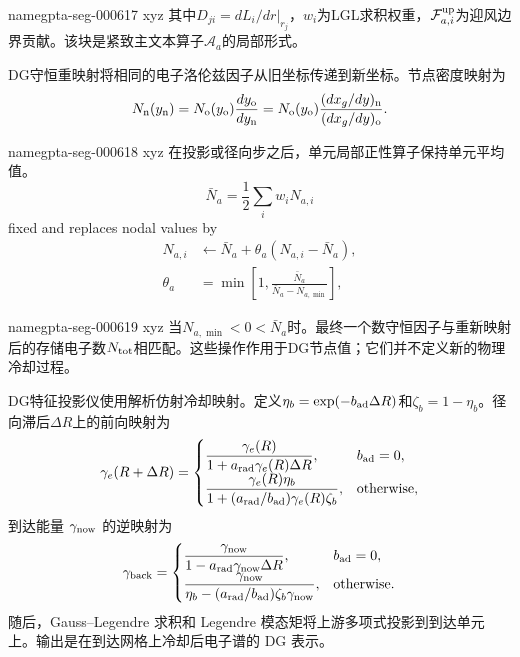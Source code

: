 \documentclass[twocolumn]{aastex702}
\makeatletter
\providecommand{\gptareaderanchor}[1]{\pdfdest name{#1} xyz}%
\providecommand{\gptareaderanchor}[1]{\special{pdf:dest (#1) [ @thispage /XYZ @xpos @ypos null ]}}%
\makeatother
\begin{document}
\gptareaderanchor{gpta-seg-000617}%
其中\(D_{ji}=\left.dL_i/dr\right|_{r_j}\)，\(w_i\)为LGL求积权重，\(\mathcal{F}_{a,i}^{\rm up}\)为迎风边界贡献。该块是紧致主文本算子\(\mathcal A_a\)的局部形式。

DG守恒重映射将相同的电子洛伦兹因子从旧坐标传递到新坐标。节点密度映射为
\begin{equation}
N_{\rm n}(y_{\rm n})=
N_{\rm o}(y_{\rm o})
\frac{dy_{\rm o}}{dy_{\rm n}}
=
N_{\rm o}(y_{\rm o})
\frac{(dx_g/dy)_{\rm n}}{(dx_g/dy)_{\rm o}} .
\end{equation}

\gptareaderanchor{gpta-seg-000618}%
在投影或径向步之后，单元局部正性算子保持单元平均值。
\begin{equation}
\bar N_a=\frac{1}{2}\sum_iw_iN_{a,i}
\end{equation}
fixed and replaces nodal values by
\begin{equation}
\begin{aligned}
N_{a,i}&\leftarrow
\bar N_a+\theta_a(N_{a,i}-\bar N_a),\\
\theta_a&=\min\left[1,\frac{\bar N_a}{\bar N_a-N_{a,\min}}\right],
\end{aligned}
\end{equation}

\gptareaderanchor{gpta-seg-000619}%
当\(N_{a,\min}<0<\bar N_a\)时。最终一个数守恒因子与重新映射后的存储电子数\(N_{\rm tot}\)相匹配。这些操作作用于DG节点值；它们并不定义新的物理冷却过程。

DG特征投影仪使用解析仿射冷却映射。定义\(\eta_b=\exp(-b_{\rm ad}\Delta R)\)和\(\zeta_b=1-\eta_b\)。径向滞后\(\Delta R\)上的前向映射为
\begin{equation}
\gamma_e(R+\Delta R)=
\begin{cases}
\displaystyle \frac{\gamma_e(R)}
{1+a_{\rm rad}\gamma_e(R)\Delta R}, &
b_{\rm ad}=0,\\[1.1ex]
\displaystyle
\frac{\gamma_e(R)\eta_b}
{1+(a_{\rm rad}/b_{\rm ad})\gamma_e(R)
\zeta_b}, & {\rm otherwise},
\end{cases}
\end{equation}
到达能量 \(\gamma_{\rm now}\) 的逆映射为
\begin{equation}
\gamma_{\rm back}=
\begin{cases}
\displaystyle \frac{\gamma_{\rm now}}
{1-a_{\rm rad}\gamma_{\rm now}\Delta R}, &
b_{\rm ad}=0,\\[1.1ex]
\displaystyle \frac{\gamma_{\rm now}}
{\eta_b-(a_{\rm rad}/b_{\rm ad})\zeta_b\gamma_{\rm now}}, &
{\rm otherwise}.
\end{cases}
\end{equation}
随后，Gauss--Legendre 求积和 Legendre 模态矩将上游多项式投影到到达单元上。输出是在到达网格上冷却后电子谱的 DG 表示。
\end{document}
